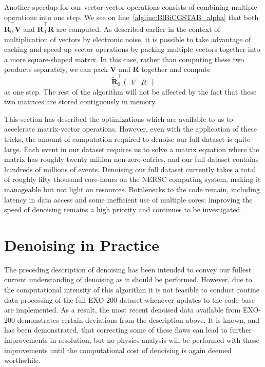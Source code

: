 Another speedup for our vector-vector operations consists of combining multiple operations into one step.  We see on line~\ref{algline:BlBiCGSTAB_alpha} that both $\mathbf{\widetilde{R}}_0^\top \mathbf{V}$ and $\mathbf{\widetilde{R}}_0^\top \mathbf{R}$ are computed.  As described earlier in the context of multiplication of vectors by electronic noise, it is possible to take advantage of caching and speed up vector operations by packing multiple vectors together into a more square-shaped matrix.  In this case, rather than computing these two products separately, we can pack $\mathbf{V}$ and $\mathbf{R}$ together and compute
\begin{equation}
\mathbf{\widetilde{R}}_0^\top \begin{pmatrix} V & R \end{pmatrix}
\end{equation}
as one step.  The rest of the algorithm will not be affected by the fact that these two matrices are stored contiguously in memory.

This section has described the optimizations which are available to us to accelerate matrix-vector operations.  However, even with the application of these tricks, the amount of computation required to denoise our full dataset is quite large.  Each event in our dataset requires us to solve a matrix equation where the matrix has roughly twenty million non-zero entries, and our full dataset contains hundreds of millions of events.  Denoising our full dataset currently takes a total of roughly fifty thousand core-hours on the NERSC computing system, making it manageable but not light on resources.  Bottlenecks to the code remain, including latency in data access and some inefficient use of multiple cores; improving the speed of denoising remains a high priority and continues to be investigated.

\section{Denoising in Practice}\label{sec:DenoisingInPractice}

The preceding description of denoising has been intended to convey our fullest current understanding of denoising as it should be performed.  However, due to the computational intensity of this algorithm it is not feasible to conduct routine data processing of the full EXO-200 dataset whenever updates to the code base are implemented.  As a result, the most recent denoised data available from EXO-200 demonstrates certain deviations from the description above.  It is known, and has been demonstrated, that correcting some of these flaws can lead to further improvements in resolution, but no physics analysis will be performed with those improvements until the computational cost of denoising is again deemed worthwhile.

